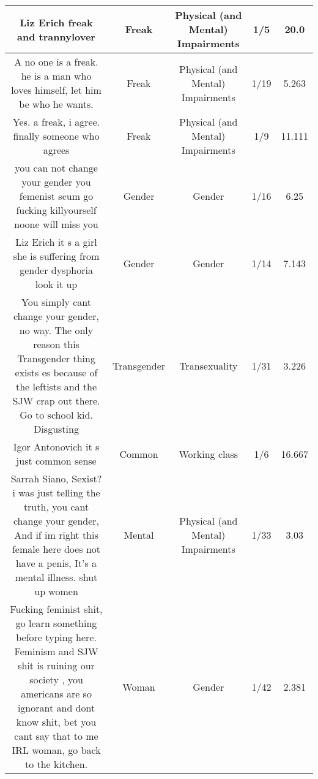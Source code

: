\documentclass[11pt]{article}
\newlength\mylength
\begin{document}
\begin{center}
\begin{longtable}{|C{.40\mylength}|C{.30\mylength}|C{.15\mylength}|C{.15\mylength}|C{.15\mylength}|}
  Liz Erich freak and trannylover  & Freak & Physical (and Mental) Impairments & 1/5 & 20.0 \\  \hline
  A no one is a freak. he is a man who loves himself, let him be who he wants.  & Freak & Physical (and Mental) Impairments & 1/19 & 5.263 \\  \hline
  Yes. a freak, i agree. finally someone who agrees  & Freak & Physical (and Mental) Impairments & 1/9 & 11.111 \\  \hline
  you can not change your gender you femenist scum go fucking killyourself noone will miss you  & Gender & Gender & 1/16 & 6.25 \\  \hline
  Liz Erich it s a girl she is suffering from gender dysphoria look it up  & Gender & Gender & 1/14 & 7.143 \\  \hline
  You simply cant change your gender, no way. The only reason this  Transgender  thing exists es because of the leftists and the SJW crap out there. Go to school kid. Disgusting  & Transgender & Transexuality & 1/31 & 3.226 \\  \hline
  Igor Antonovich it s just common sense  & Common & Working class & 1/6 & 16.667 \\  \hline
  Sarrah Siano, Sexist? i was just telling the truth, you cant change your gender, And if im right this female  here does not have a penis, It's a mental illness. shut up women  & Mental & Physical (and Mental) Impairments & 1/33 & 3.03 \\  \hline
  Fucking feminist shit, go learn something before typing here.  Feminism and SJW shit is ruining our society , you americans are so ignorant and dont know shit, bet  you cant say that   to me IRL woman, go back to the kitchen.  & Woman & Gender & 1/42 & 2.381 \\  \hline

\end{longtable}
\end{center}
\end{document}
